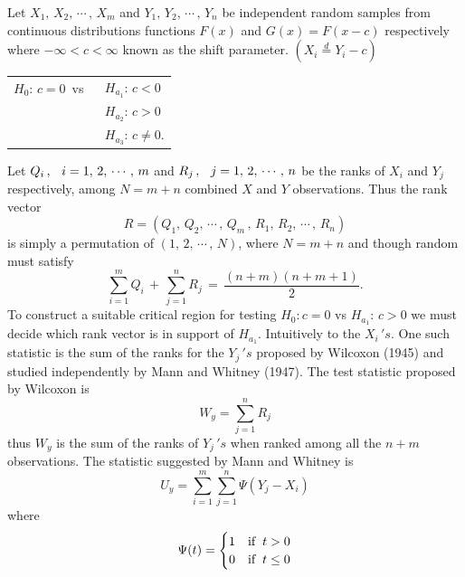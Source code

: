 \documentclass[12pt,a4paper]{report}
\theoremstyle{definition}
\theoremstyle{plain}
\begin{document}
Let $X_1, \, X_2,\, \cdots\, , \, X_m$ and $Y_1, \, Y_2,\, \cdots\, , \, Y_n$ be independent random samples from continuous distributions functions $F(x)$ and $G(x) = F(x - c)$ respectively where $-\infty < c < \infty$ known as the shift parameter. $(X_i \overset{d}{=} Y_i - c)$
\begin{table}[H]
\centering
\begin{tabular}{cl}
$H_0: \, c = 0\, $ vs $\, $ & $\,H_{a_1}:\, c < 0$\\
                            & $\,H_{a_2}: \, c > 0$\\
                            & $\,H_{a_3}:\, c\neq 0$.\\
\end{tabular}
\end{table}



Let $Q_i\, , \, \hspace{0.2cm} i = 1, \, 2, \, \cdots\, , \, m$ and $R_j\,  , \, \hspace{0.2cm} j = 1, \,  2, \, \cdots\, , \, n$ be the ranks of $X_i$ and $Y_j$ respectively, among $N = m + n$ combined $X$ and $Y$ observations. Thus the rank vector $$R = \left(Q_1, \, Q_2, \, \cdots\, , \, Q_m\, , \, R_1, \, R_2,\, \cdots\, , \, R_n\right)$$ is simply a permutation of $(1,\, 2,\, \cdots\, ,\, N)$, where $N = m + n$ and though random must satisfy
$$\sum^m_{i = 1} Q_i \, + \, \sum^n_{j = 1} R_j \, = \, \frac{(n + m)(n + m + 1)}{2}.$$
To construct a suitable critical region for testing $H_0 : c = 0$ vs $H_{a_1}:\, c> 0$ we must decide which rank vector is in support of $H_{a_1}$. Intuitively to the $X_i\,'s$. One such statistic is the sum of the ranks for the $Y_j\, 's$ proposed by Wilcoxon (1945) and studied independently by Mann and Whitney (1947). The test statistic proposed by Wilcoxon is 
\begin{equation}
W_y = \sum^n_{j = 1} R_j 
\end{equation}
thus $W_y$ is the sum of the ranks of $Y_j\, 's$ when ranked among all the $n + m$ observations. The statistic suggested by Mann and Whitney is 
\begin{equation}
U_y = \sum^m_{i = 1}\sum^n_{j = 1} \Psi(Y_j - X_i)
\end{equation}
where
$$\Psi(t) = \begin{cases}
1 & \text{if}\hspace{0.2cm} t > 0\\
0 & \text{if}\hspace{0.2cm} t\leq 0\\
\end{cases}
$$
\end{document}
